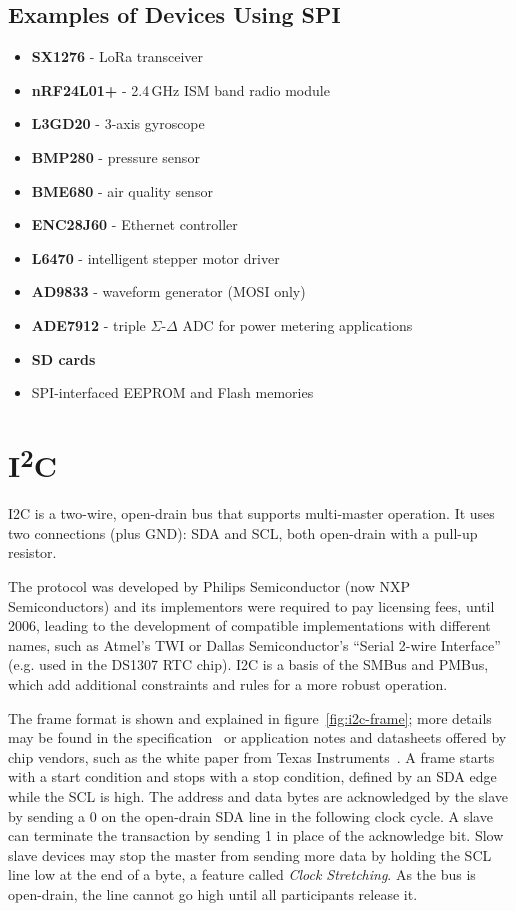 \pagebreak[1] %
\subsection{Examples of Devices Using SPI}

\begin{itemize}
	\item \textbf{SX1276} - LoRa transceiver
	\item \textbf{nRF24L01+} - 2.4\,GHz ISM band radio module
	\item \textbf{L3GD20} - 3-axis gyroscope
	\item \textbf{BMP280} - pressure sensor
	\item \textbf{BME680} - air quality sensor
	\item \textbf{ENC28J60} - Ethernet controller
	\item \textbf{L6470} - intelligent stepper motor driver
	\item \textbf{AD9833} - waveform generator (\gls{MOSI} only)
	\item \textbf{ADE7912} - triple $\Sigma$-$\Delta$ \gls{ADC} for power metering applications
	\item \textbf{SD cards}~\cite{sd-spec}
	\item SPI-interfaced EEPROM and Flash memories
\end{itemize}

\section{I\textsuperscript{2}C} \label{sec:theory-i2c}

\acrfull{I2C} is a two-wire, open-drain bus that supports multi-master operation.
It uses two connections (plus \gls{GND}): \gls{SDA} and \gls{SCL}, both open-drain with a pull-up resistor.

The protocol was developed by Philips Semiconductor (now NXP Semiconductors) and its implementors were required to pay licensing fees, until 2006, leading to the development of compatible implementations with different names, such as Atmel's \gls{TWI} or Dallas Semiconductor's ``Serial 2-wire Interface'' (e.g. used in the DS1307 \gls{RTC} chip). \gls{I2C} is a basis of the \gls{SMBus} and \gls{PMBus}, which add additional constraints and rules for a more robust operation.

The frame format is shown and explained in figure~\ref{fig:i2c-frame}; more details may be found in the specification~\cite{i2c-spec} or application notes and datasheets offered by chip vendors, such as the white paper from Texas Instruments~\cite{understanding-i2c}. A frame starts with a start condition and stops with a stop condition, defined by an \gls{SDA} edge while the \gls{SCL} is high. The address and data bytes are acknowledged by the slave by sending a 0 on the open-drain \gls{SDA} line in the following clock cycle. A slave can terminate the transaction by sending 1 in place of the acknowledge bit. Slow slave devices may stop the master from sending more data by holding the SCL line low at the end of a byte, a feature called \textit{Clock Stretching}. As the bus is open-drain, the line cannot go high until all participants release it.

